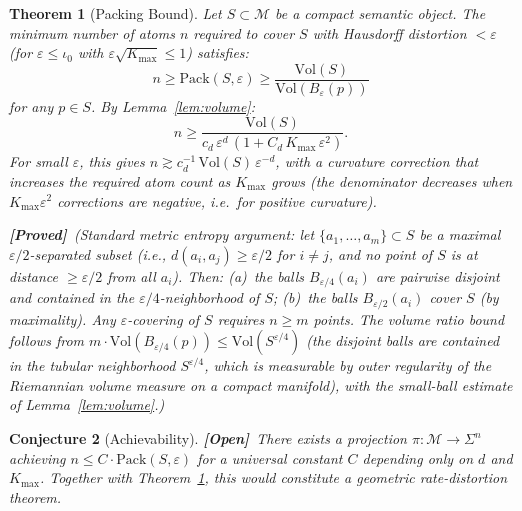 \documentclass[11pt,a4paper]{article}
\newtheorem{theorem}{Theorem}[section]
\newtheorem{conjecture}[theorem]{Conjecture}
\theoremstyle{definition}
\theoremstyle{remark}
\newcommand{\Vol}{\mathrm{Vol}}
\newcommand{\Pack}{\mathrm{Pack}}
\newcommand{\statusproved}{\textcolor{green!50!black}{\textbf{[Proved]}}}
\newcommand{\statusopen}{\textcolor{red!70!black}{\textbf{[Open]}}}
\begin{document}
\begin{theorem}[Packing Bound]\label{thm:packing}
Let $S \subset \mathcal{M}$ be a compact semantic object. The 
minimum number of atoms $n$ required to cover $S$ with Hausdorff 
distortion $< \varepsilon$ (for 
$\varepsilon \leq \iota_0$ with 
$\varepsilon\sqrt{K_{\max}} \leq 1$) satisfies:
\begin{equation}\label{eq:packing_bound}
    n \geq \Pack(S, \varepsilon) \geq 
    \frac{\Vol(S)}{\Vol(B_\varepsilon(p))}
\end{equation}
for any $p \in S$. By Lemma~\ref{lem:volume}:
\begin{equation}\label{eq:rate_distortion}
    n \geq \frac{\Vol(S)}{c_d\,\varepsilon^d\,
    (1 + C_d\,K_{\max}\,\varepsilon^2)}.
\end{equation}
For small $\varepsilon$, this gives 
$n \gtrsim c_d^{-1}\,\Vol(S)\,\varepsilon^{-d}$, with a 
curvature correction that increases the required atom count 
as $K_{\max}$ grows (the denominator decreases when 
$K_{\max}\varepsilon^2$ corrections are negative, i.e.\ for 
positive curvature).

\statusproved\ (Standard metric entropy argument: let 
$\{a_1, \ldots, a_m\} \subset S$ be a maximal 
$\varepsilon/2$-separated subset (i.e., 
$d(a_i, a_j) \geq \varepsilon/2$ for $i \neq j$, and no 
point of $S$ is at distance $\geq \varepsilon/2$ from all 
$a_i$). Then: (a)~the balls $B_{\varepsilon/4}(a_i)$ are 
pairwise disjoint and contained in the 
$\varepsilon/4$-neighborhood of $S$; (b)~the balls 
$B_{\varepsilon/2}(a_i)$ cover $S$ (by maximality). Any 
$\varepsilon$-covering of $S$ requires $n \geq m$ points. The 
volume ratio bound follows from 
$m \cdot \Vol(B_{\varepsilon/4}(p)) \leq 
\Vol(S^{\varepsilon/4})$ (the disjoint balls are contained in 
the tubular neighborhood $S^{\varepsilon/4}$, which is 
measurable by outer regularity of the Riemannian volume 
measure on a compact manifold), with the small-ball estimate of 
Lemma~\ref{lem:volume}.)
\end{theorem}

\begin{conjecture}[Achievability]\label{conj:achievability}
\statusopen\ There exists a projection $\pi : \mathcal{M} \to 
\Sigma^n$ achieving $n \leq C \cdot \Pack(S, \varepsilon)$ for 
a universal constant $C$ depending only on $d$ and $K_{\max}$. 
Together with Theorem~\ref{thm:packing}, this would constitute 
a geometric rate-distortion theorem.
\end{conjecture}
\end{document}
